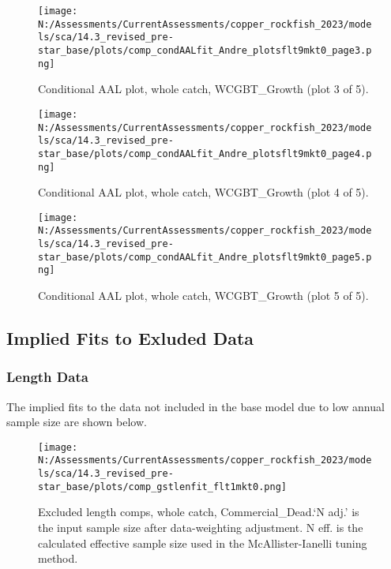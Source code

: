 \documentclass[11pt,
  english,
  letterpaper,
]{article}
\begin{document}
\begin{figure}
\centering
\texttt{[image: N:/Assessments/CurrentAssessments/copper\_rockfish\_2023/models/sca/14.3\_revised\_pre-star\_base/plots/comp\_condAALfit\_Andre\_plotsflt9mkt0\_page3.png]}
\caption{Conditional AAL plot, whole catch, WCGBT\_Growth (plot 3 of 5).\label{fig:comp_condAALfit_Andre_plotsflt9mkt0_page3}}
\end{figure}

\begin{figure}
\centering
\texttt{[image: N:/Assessments/CurrentAssessments/copper\_rockfish\_2023/models/sca/14.3\_revised\_pre-star\_base/plots/comp\_condAALfit\_Andre\_plotsflt9mkt0\_page4.png]}
\caption{Conditional AAL plot, whole catch, WCGBT\_Growth (plot 4 of 5).\label{fig:comp_condAALfit_Andre_plotsflt9mkt0_page4}}
\end{figure}

\begin{figure}
\centering
\texttt{[image: N:/Assessments/CurrentAssessments/copper\_rockfish\_2023/models/sca/14.3\_revised\_pre-star\_base/plots/comp\_condAALfit\_Andre\_plotsflt9mkt0\_page5.png]}
\caption{Conditional AAL plot, whole catch, WCGBT\_Growth (plot 5 of 5).\label{fig:comp_condAALfit_Andre_plotsflt9mkt0_page5}}
\end{figure}

\pagebreak

\hypertarget{excluded-data}{%
\subsection{Implied Fits to Exluded Data}\label{excluded-data}}

\hypertarget{length-data-1}{%
\subsubsection{Length Data}\label{length-data-1}}

The implied fits to the data not included in the base model due to low annual sample size are shown below.

\begin{figure}
\centering
\texttt{[image: N:/Assessments/CurrentAssessments/copper\_rockfish\_2023/models/sca/14.3\_revised\_pre-star\_base/plots/comp\_gstlenfit\_flt1mkt0.png]}
\caption{Excluded length comps, whole catch, Commercial\_Dead.`N adj.' is the input sample size after data-weighting adjustment. N eff. is the calculated effective sample size used in the McAllister-Ianelli tuning method.\label{fig:comp_gstlenfit_flt1mkt0}}
\end{figure}
\end{document}
